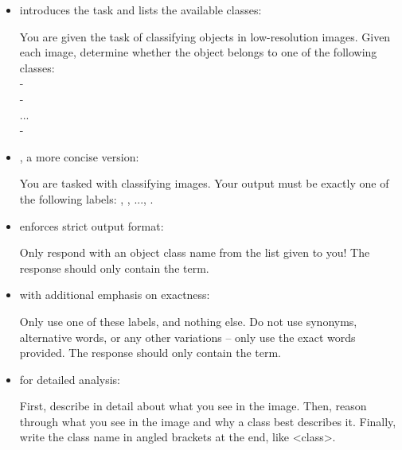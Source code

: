 \documentclass[../ShajiS_RnDReport.tex]{subfiles}
\begin{document}
\begin{itemize}
    \item {} introduces the task and lists the available classes:
    \begin{promptbox}
    You are given the task of classifying objects in low-resolution images. 
    Given each image, determine whether the object belongs to one of the following classes: \\
    -  \\
    -  \\
    ... \\
    - 
    \end{promptbox}

    \item {}, a more concise version:
    \begin{promptbox}
    You are tasked with classifying images. Your output must be exactly one of the following labels: 
    , , ..., .
    \end{promptbox}

    \item {} enforces strict output format:
    \begin{promptbox}
    Only respond with an object class name from the list given to you! The response should only contain the term.
    \end{promptbox}

    \item {} with additional emphasis on exactness:
    \begin{promptbox}
    Only use one of these labels, and nothing else. Do not use synonyms, alternative words, or any other variations -- only use the exact words provided. The response should only contain the term.
    \end{promptbox}

    \item {} for detailed analysis:
    \begin{promptbox}
    First, describe in detail about what you see in the image. Then, reason through what you see in the image and why a class best describes it. Finally, write the class name in angled brackets at the end, like <class>.
    \end{promptbox}
\end{itemize}
\end{document}
